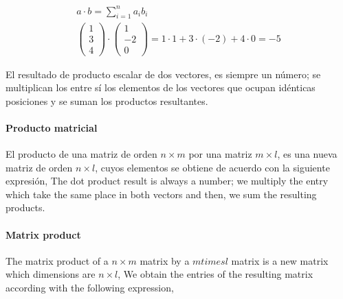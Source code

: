 \begin{gather*}
a\cdot b=\sum_{i=1}^na_ib_i\\
\begin{pmatrix}
1\\
3\\
4
\end{pmatrix}\cdot
\begin{pmatrix}
1\\
-2\\
0
\end{pmatrix}
=1\cdot 1+3 \cdot (-2)+ 4 \cdot 0= -5
\end{gather*}
\begin{paracol}{2}
El resultado de producto escalar de dos vectores, es siempre un número; se multiplican los entre sí los elementos de los vectores que ocupan idénticas posiciones y se suman los productos resultantes. 

\paragraph{Producto matricial}
El producto de una matriz de orden $n\times m$ por una matriz $m\times l$, es una nueva matriz de orden $n\times l$, cuyos elementos se obtiene de acuerdo con la siguiente expresión,
\switchcolumn
The dot product result is always a number; we multiply the entry which take the same place in both vectors and then, we sum the resulting products. 

\paragraph{Matrix product} The matrix product of a $n \times m$ matrix by a $mtimes l$ matrix is a new matrix which dimensions are $n\times l$, We obtain the entries of the resulting matrix according with the following expression,    
\end{paracol}


